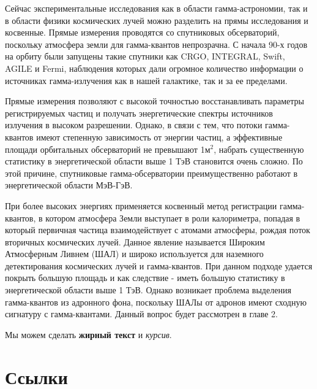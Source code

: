 Сейчас экспериментальные исследования как в области гамма-астрономии, так и в области физики космических лучей можно разделить на прямы исследования и косвенные. Прямые измерения проводятся со спутниковых обсерваторий, поскольку атмосфера земли для гамма-квантов непрозрачна. С начала 90-х годов на орбиту были запущены такие спутники как CRGO, INTEGRAL, Swift, AGILE и Fermi, наблюдения которых дали огромное количество информации о источниках гамма-излучения как в нашей галактике, так и за ее пределами. 

Прямые измерения позволяют с высокой точностью восстанавливать параметры регистрируемых частиц и получать энергетические спектры источников излучения в высоком разрешении. Однако, в связи с тем, что потоки гамма-квантов имеют степенную зависимость от энергии частиц, а эффективные площади орбитальных обсерваторий не превышают 1$м^2$, набрать существенную статистику в энергетической области выше 1 ТэВ становится очень сложно. По этой причине, спутниковые гамма-обсерватории преимущественно работают в энергетической области МэВ-ГэВ. 

При более высоких энергиях применяется косвенный метод регистрации гамма-квантов, в котором атмосфера Земли выступает в роли калориметра, попадая в который первичная частица взаимодействует с атомами атмосферы, рождая поток вторичных космических лучей. Данное явление называется Широким Атмосферным Ливнем (ШАЛ) и широко используется для наземного детектирования космических лучей и гамма-квантов. При данном подходе удается покрыть большую площадь и как следствие - иметь большую статистику в энергетической области выше 1 ТэВ. Однако возникает проблема выделения гамма-квантов из адронного фона, поскольку ШАЛы от адронов имеют сходную сигнатуру с гамма-квантами. Данный вопрос будет рассмотрен в главе 2. 

Мы можем сделать \textbf{жирный текст} и \textit{курсив}.

\section{Ссылки}\label{sec:ch1/sec3}

